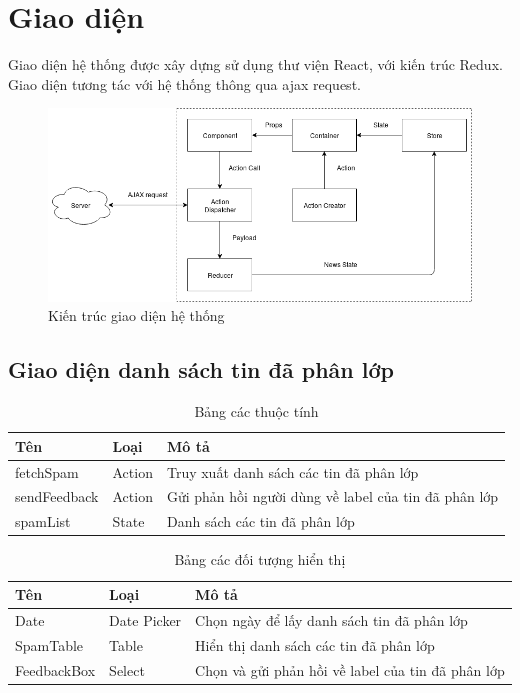 \section{Giao diện}
Giao diện hệ thống được xây dựng sử dụng thư viện React, với kiến trúc Redux. Giao diện tương tác với hệ thống thông qua ajax request.
	\begin{figure}[H]
		\centering
		\includegraphics[width=1\linewidth]{Chapter3/Chapter3Figs/FrontEndArch}
		\caption{Kiến trúc giao diện hệ thống}
		\label{fig:layers}
	\end{figure}

  \subsection{Giao diện danh sách tin đã phân lớp}
  \begin{table}[H]
    \centering
    \setlength{\tabcolstep}{12pt}
    \begin{tabular}{@{}lll@{}} \toprule
      Tên  & Loại   & Mô tả \\ \midrule
      fetchSpam &  Action   & Truy xuất danh sách các tin đã phân lớp \\
      sendFeedback & Action & Gửi phản hồi người dùng về label của tin đã phân lớp \\
      spamList     & State       & Danh sách các tin đã phân lớp  \\ \bottomrule
    \end{tabular}
    \caption{Bảng các thuộc tính}
  \end{table}
  \begin{table}[H]
    \centering
    \setlength{\tabcolstep}{12pt}
    \begin{tabular}{@{}lll@{}} \toprule
      Tên  & Loại   & Mô tả \\ \midrule
      Date  &  Date Picker & Chọn ngày để lấy danh sách tin đã phân lớp \\
      SpamTable  & Table & Hiển thị danh sách các tin đã phân lớp \\
      FeedbackBox & Select & Chọn và gửi phản hồi về label của tin đã phân lớp \\ \bottomrule
    \end{tabular}
    \caption{Bảng các đối tượng hiển thị}
  \end{table}

